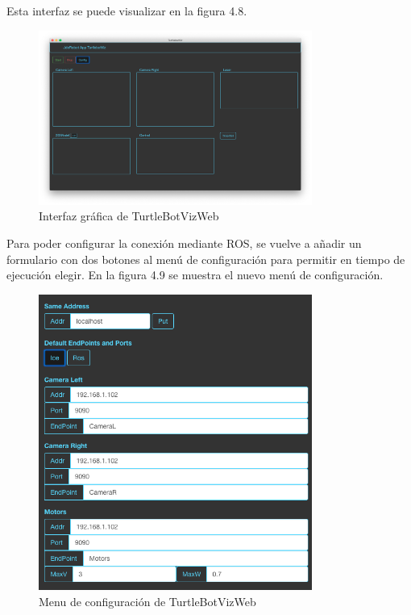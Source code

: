 Esta interfaz se puede visualizar en la figura 4.8.

\begin{figure}[H]
  \begin{center}
    \includegraphics[width=0.8\textwidth]{figures/interfazTurtleBotviz.png}
		\caption{Interfaz gráfica de TurtleBotVizWeb}
		\label{fig.iterfazTurtleBotviz}
		\end{center}
\end{figure}

Para poder configurar la conexión mediante ROS, se vuelve a añadir un formulario con dos botones al menú de configuración para permitir en tiempo de ejecución elegir.
En la figura 4.9 se muestra el nuevo menú de configuración.

\begin{figure}[H]
  \begin{center}
    \includegraphics[width=0.8\textwidth]{figures/configTurtleBot.png}
		\caption{Menu de configuración de TurtleBotVizWeb}
		\label{fig.configTurtleBot}
		\end{center}
\end{figure}

